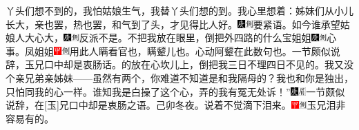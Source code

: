 丫头们想不到的，我怕姑娘生气，我替丫头们想的到。我心里想着：姊妹们从小儿长大，亲也罢，热也罢，和气到了头，才见得比人好。{\includegraphics[width=3mm]{../Images/00004}\includegraphics[width=3mm]{../Images/00011}\footnotesize \kaishu 要紧语。}如今谁承望姑娘人大心大，{\includegraphics[width=3mm]{../Images/00004}\includegraphics[width=3mm]{../Images/00011}\footnotesize \kaishu 反派不是。}不把我放在眼里，倒把外四路的什么宝姐姐{\includegraphics[width=3mm]{../Images/00004}\includegraphics[width=3mm]{../Images/00011}\footnotesize \kaishu 心事。}凤姐姐{\includegraphics[width=3mm]{../Images/00002}\includegraphics[width=3mm]{../Images/00011}\footnotesize \kaishu 用此人瞒看官也，瞒颦儿也。心动阿颦在此数句也。一节颇似说辞，玉兄口中却是衷肠话。}的放在心坎儿上，倒把我三日不理四日不见的。我又没个亲兄弟亲姊妹------虽然有两个，你难道不知道是和我隔母的？我也和你是独出，只怕同我的心一样。谁知我是白操了这个心，弄的我有冤无处诉！”{\includegraphics[width=3mm]{../Images/00004}\includegraphics[width=3mm]{../Images/00010}\footnotesize \kaishu 一节颇似说辞，在{[}玉{]}兄口中却是衷肠之语。己卯冬夜。}说着不觉滴下泪来。{\includegraphics[width=3mm]{../Images/00002}\includegraphics[width=3mm]{../Images/00011}\footnotesize \kaishu 玉兄泪非容易有的。}

